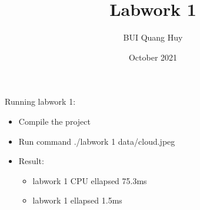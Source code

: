 \documentclass{article}
\title{Labwork 1}
\author{BUI Quang Huy}
\date{October 2021}
\begin{document}
\maketitle

Running labwork 1:
\begin{itemize}
    \item Compile the project
    \item Run command ./labwork 1 data/cloud.jpeg
    \item Result:\begin{itemize}
        \item labwork 1 CPU ellapsed 75.3ms
        \item labwork 1 ellapsed 1.5ms
    \end{itemize}
\end{itemize}
\end{document}
